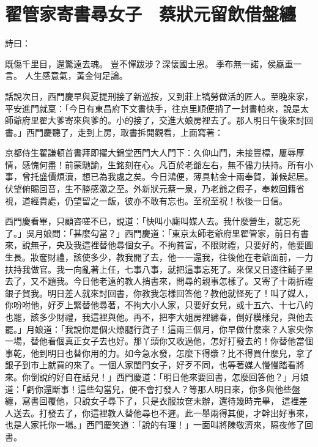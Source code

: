 %

\chapter{翟管家寄書尋女子　蔡狀元留飲借盤纏}

\begin{showcontents}{}


詩曰：

既傷千里目，還驚遠去魂。
豈不憚跋涉？深懷國士恩。
季布無一諾，侯嬴重一言。
人生感意氣，黃金何足論。

話說次日，西門慶早與夏提刑接了新巡按，又到莊上犒勞做活的匠人。至晚來家，平安進門就稟：「今日有東昌府下文書快手，往京里順便捎了一封書帕來，說是太師爺府里翟大爹寄來與爹的。小的接了，交進大娘房裡去了。那人明日午後來討回書。」西門慶聽了，走到上房，取書拆開觀看，上面寫著：

京都侍生翟謙頓首書拜即擢大錦堂西門大人門下：久仰山鬥，未接豐標，屢辱厚情，感愧何盡！前蒙馳諭，生銘刻在心。凡百於老爺左右，無不儘力扶持。所有小事，曾托盛價煩瀆，想已為我處之矣。今日鴻便，薄具帖金十兩奉賀，兼候起居。伏望俯賜回音，生不勝感激之至。外新狀元蔡一泉，乃老爺之假子，奉敕回籍省視，道經貴處，仍望留之一飯，彼亦不敢有忘也。至祝至祝！秋後一日信。

西門慶看畢，只顧咨嗟不已，說道：「快叫小廝叫媒人去。我什麼營生，就忘死了。」吳月娘問：「甚麼勾當？」西門慶道：「東京太師老爺府里翟管家，前日有書來，說無子，央及我這裡替他尋個女子。不拘貧富，不限財禮，只要好的，他要圖生長。妝奩財禮，該使多少，教我開了去，他一一還我，往後他在老爺面前，一力扶持我做官。我一向亂著上任，七事八事，就把這事忘死了。來保又日逐往鋪子里去了，又不題我。今日他老遠的教人捎書來，問尋的親事怎樣了。又寄了十兩折禮銀子賀我。明日差人就來討回書，你教我怎樣回答他？教他就怪死了！叫了媒人，你吩咐他，好歹上緊替他尋著，不拘大小人家，只要好女兒，或十五六、十七八的也罷，該多少財禮，我這裡與他。再不，把李大姐房裡繡春，倒好模樣兒，與他去罷。」月娘道：「我說你是個火燎腿行貨子！這兩三個月，你早做什麼來？人家央你一場，替他看個真正女子去也好。那丫頭你又收過他，怎好打發去的！你替他當個事乾，他到明日也替你用的力。如今急水發，怎麼下得漿？比不得買什麼兒，拿了銀子到市上就買的來了。一個人家閨門女子，好歹不同，也等著媒人慢慢踏看將來。你倒說的好自在話兒！」西門慶道：「明日他來要回書，怎麼回答他？」月娘道：「虧你還斷事！這些勾當兒，便不會打發人？等那人明日來，你多與他些盤纏，寫書回覆他，只說女子尋下了，只是衣服妝奩未辦，還待幾時完畢，
這裡差人送去。打發去了，你這裡教人替他尋也不遲。此一舉兩得其便，才幹出好事來，也是人家托你一場。」西門慶笑道：「說的有理！」一面叫將陳敬濟來，隔夜修了回書。


\end{showcontents}
